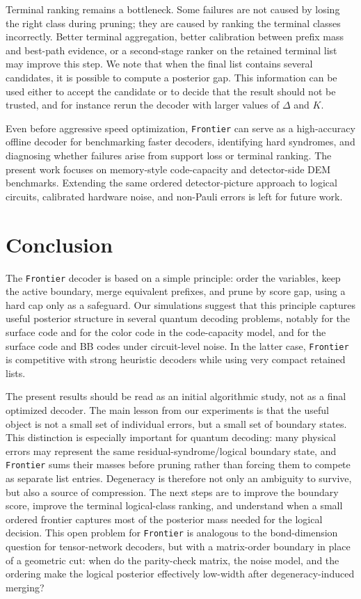 \documentclass[a4paper,twocolumn,11pt,unpublished]{quantumarticle}
\newcommand{\frontier}{\texttt{Frontier}}
\begin{document}
Terminal ranking remains a bottleneck. Some failures are not caused by losing the right class during pruning; they are caused by ranking the terminal classes incorrectly. Better terminal aggregation, better calibration between prefix mass and best-path evidence, or a second-stage ranker on the retained terminal list may improve this step.
We note that when the final list contains several candidates, it is possible to compute a posterior gap. This information can be used either to accept the candidate or to decide that the result should not be trusted, and for instance rerun the decoder with larger values of $\Delta$ and $K$. 

Even before aggressive speed optimization, \frontier{} can serve as a
high-accuracy offline decoder for benchmarking faster decoders, identifying hard
syndromes, and diagnosing whether failures arise from support loss or terminal
ranking. The present work focuses on memory-style code-capacity and
detector-side DEM benchmarks. Extending the same ordered detector-picture
approach to logical circuits, calibrated hardware noise, and non-Pauli errors
is left for future work.

\section{Conclusion}


The \frontier{} decoder is based on a simple principle: order the variables,
keep the active boundary, merge equivalent prefixes, and prune by score gap,
using a hard cap only as a safeguard. Our simulations suggest
that this principle captures useful posterior structure in several quantum
decoding problems, notably for the surface code and for the color code in the code-capacity model, and for the surface code and BB codes under circuit-level noise.
In the latter case, \frontier{} is competitive with strong
heuristic decoders while using very compact retained lists.

The present results should be read as an initial algorithmic study, not as a
final optimized decoder. The main lesson from our experiments is that the useful object is
not a small set of individual errors, but a small set of boundary states.
This distinction is especially important for quantum decoding: many physical
errors may represent the same residual-syndrome/logical boundary state, and
\frontier{} sums their masses before pruning rather than forcing them to
compete as separate list entries. Degeneracy is therefore not only an ambiguity
to survive, but also a source of compression. The next steps are to improve the
boundary score, improve the terminal logical-class ranking, and understand
when a small ordered frontier captures most of the posterior mass needed for
the logical decision. This open problem for \frontier{} is
analogous to the bond-dimension question for tensor-network decoders, but with
a matrix-order boundary in place of a geometric cut: when do the parity-check
matrix, the noise model, and the ordering make the logical posterior
effectively low-width after degeneracy-induced merging?
\end{document}
